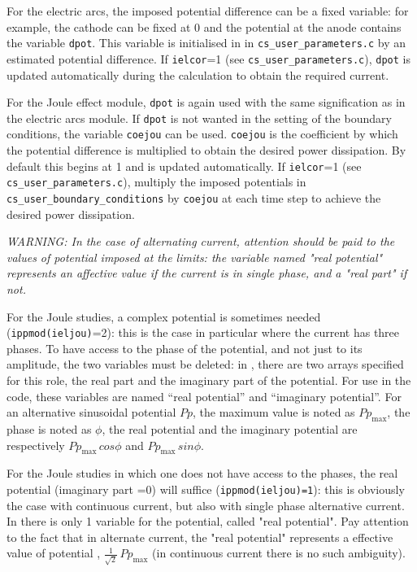 {{{\begin{list}{-}{}
\item For the electric arcs, the imposed potential difference can be a fixed variable:
 for example, the cathode can be fixed at 0 and the potential at the anode
 contains the variable \texttt{dpot}. This variable is initialised in
in \texttt{cs\_user\_parameters.c}
 by an estimated potential difference. If \texttt{ielcor}=1 (see
 \texttt{cs\_user\_parameters.c}), \texttt{dpot} is updated automatically during the
 calculation to obtain the required current.
\item For the Joule effect module, \texttt{dpot} is again used with the same
 signification as in the electric arcs module. If \texttt{dpot} is not wanted
 in the setting of the boundary conditions, the variable \texttt{coejou} can be
 used. \texttt{coejou} is the coefficient by which the potential difference is
 multiplied to obtain the desired power dissipation. By default this begins at
 1 and is updated automatically. If \texttt{ielcor}=1 (see \texttt
{cs\_user\_parameters.c}), multiply the imposed potentials in
\texttt{cs\_user\_boundary\_conditions} by \texttt{coejou} at each time step to
achieve the desired power dissipation.
 \end{list}

 {\em WARNING: In the case of alternating current, attention should be paid to the values of potential
 imposed at the limits: the variable named "real potential" represents an affective
 value if the current is in single phase, and a "real part" if not.}
\begin{list}{-}{}
\item For the Joule studies, a complex potential is sometimes needed
 (\texttt{ippmod(ieljou)}=2): this is the  case in particular where the current
 has three phases. To have access to the phase of the potential, and not just to its
 amplitude, the two variables must be deleted: in \CS, there are two arrays
 specified for this role, the real part and the imaginary
 part of the potential. For use in the code, these variables are named
 ``real potential'' and ``imaginary potential''. For an alternative
 sinusoidal potential $Pp$, the maximum value is noted as $Pp_\text{max}$,
 the phase is noted as $\phi$, the real potential
 and the imaginary potential are respectively $Pp_\text{max}\,cos\phi$ and
$Pp_\text{max}\,sin\phi$.
\item For the Joule studies in which one does not have access to the phases, the real
 potential (imaginary part =0) will suffice (\texttt{ippmod(ieljou)=1}): this is
 obviously the case with
 continuous current, but also with single phase alternative current. In \CS
there is only 1 variable for the potential,  called "real potential". Pay attention to
 the fact that in alternate current, the "real potential" represents a effective value
 of potential , $\frac{1}{\sqrt{2}}\,Pp_\text{max}$ (in continuous current there is no
 such ambiguity).
\end{list}

}}}
